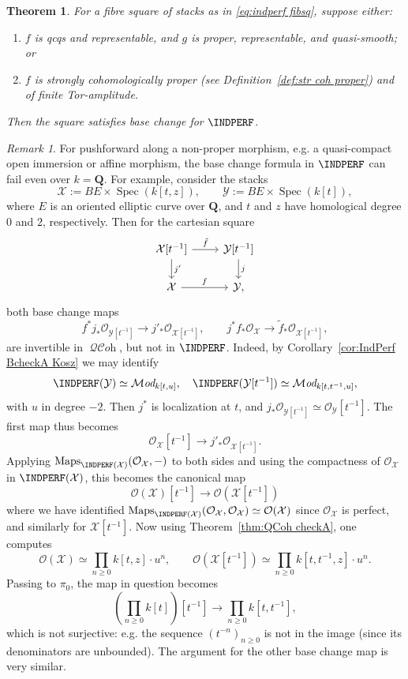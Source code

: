 \documentclass[12pt, oneside]{amsart}
\numberwithin{equation}{section}
\newtheorem{theorem}[subsubsection]{Theorem}
\theoremstyle{remark}
\newtheorem{remark}[subsubsection]{Remark}
\theoremstyle{plain}
\renewcommand{\ge}{\geqslant}
\renewcommand{\geq}{\geqslant}
\newcommand{\MOD}{\mathcal{M}\textit{od}}
\DeclareMathOperator{\QCOH}{\mathcal{QC}\textit{oh}}
\DeclareMathOperator{\Map}{Maps}
\newcommand{\OO}{\mathcal{O}}
\newcommand{\YY}{\mathcal{Y}}
\newcommand{\XX}{\mathcal{X}}
\DeclareMathOperator{\spc}{Spec}
\newcommand{\bQ}{\mathbf{Q}}
\begin{document}
\begin{theorem}\label{thm:bcindperf}
  For a fibre square of stacks as in \eqref{eq:indperf fibsq}, suppose either:
  \begin{enumerate}
    \item $f$ is qcqs and representable, and $g$ is proper,
    representable, and quasi-smooth; or
    \item $f$ is strongly cohomologically proper (see Definition~\ref{def:str coh proper}) and of
    finite Tor-amplitude.
  \end{enumerate}
  Then the square satisfies base change for $\INDPERF$.
\end{theorem}

\begin{remark}\label{rem:indperf open base change}
For pushforward along a non-proper morphism, e.g. a quasi-compact open immersion or affine morphism, the base change formula in $\INDPERF$ can fail even over $k=\mathbf{Q}$.
For example, consider the stacks
\[
  \XX := BE\times\spc(k[t,z]),
  \qquad \YY := BE\times\spc(k[t]),
\]
where $E$ is an oriented elliptic curve over $\bQ$, and $t$ and $z$ have homological degree $0$ and $2$, respectively.
Then for the cartesian square
\[
\begin{tikzcd}
  \XX[t^{-1}] \arrow{d}{j'}\arrow{r}{\tilde{f}}
  & \YY[t^{-1}]\arrow{d}{j}\\
  \XX\arrow{r}{f} & \YY,
\end{tikzcd}
\]
both base change maps
\[
  f^*j_*\OO_{\YY[t^{-1}]}\longrightarrow j'_*\OO_{\XX[t^{-1}]},
  \qquad
  j^*f_*\OO_\XX\longrightarrow \tilde{f}_*\OO_{\XX[t^{-1}]},
\]
are invertible in $\QCOH$, but not in $\INDPERF$.
Indeed, by Corollary~\ref{cor:IndPerf BcheckA Kosz} we may identify
\[
  \INDPERF(\YY)\simeq\MOD_{k[t,u]},\quad
  \INDPERF(\YY[t^{-1}])\simeq\MOD_{k[t,t^{-1},u]},
\]
with $u$ in degree $-2$.
Then $j^*$ is localization at $t$, and $j_*\OO_{\YY[t^{-1}]}\simeq\OO_\YY[t^{-1}]$.
The first map thus becomes
\[
  \OO_\XX[t^{-1}] \longrightarrow j'_* \OO_{\XX[t^{-1}]}.
\]
Applying $\Map_{\INDPERF(\XX)}(\OO_\XX, -)$ to both sides and using the compactness of $\OO_\XX$ in $\INDPERF(\XX)$, this becomes the canonical map
\[
  \OO(\XX)[t^{-1}] \longrightarrow \OO(\XX[t^{-1}])
\]
where we have identified $\Map_{\INDPERF(\XX)}(\OO_\XX, \OO_\XX) \simeq \OO(\XX)$ since $\OO_\XX$ is perfect, and similarly for $\XX[t^{-1}]$.
Now using Theorem~\ref{thm:QCoh checkA}, one computes
\[
  \OO(\XX) \simeq \prod_{n\ge 0} k[t,z] \cdot u^n,
  \qquad \OO(\XX[t^{-1}]) \simeq \prod_{n\ge 0} k[t,t^{-1},z] \cdot u^n.
\]
Passing to $\pi_0$, the map in question becomes
\[
  \left(\prod_{n\geq0}k[t]\right)[t^{-1}]
  \longrightarrow \prod_{n\geq0}k[t,t^{-1}],
\]
which is not surjective: e.g. the sequence $(t^{-n})_{n\geq0}$ is not in the image (since its denominators are unbounded).
The argument for the other base change map is very similar.
\end{remark}
\end{document}
